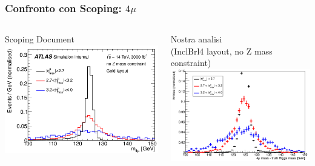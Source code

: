 \documentclass{beamer}
\begin{document}
\begin{frame}[t]
\frametitle{Confronto con Scoping: $4\mu$ }

\begin{columns}
\begin{column}{.5\textwidth}
\centering
\vskip1.2cm
Scoping Document
\includegraphics[width=\textwidth]{scopingRecoMass}
\end{column}
\begin{column}{.5\textwidth}
\centering
\vskip0.8cm
Nostra analisi \\(InclBrl4 layout, no Z mass constraint)
\includegraphics[width=\textwidth]{HZZ4mu/recoMass}
\end{column}

\end{columns}
\end{frame}

\end{document}
